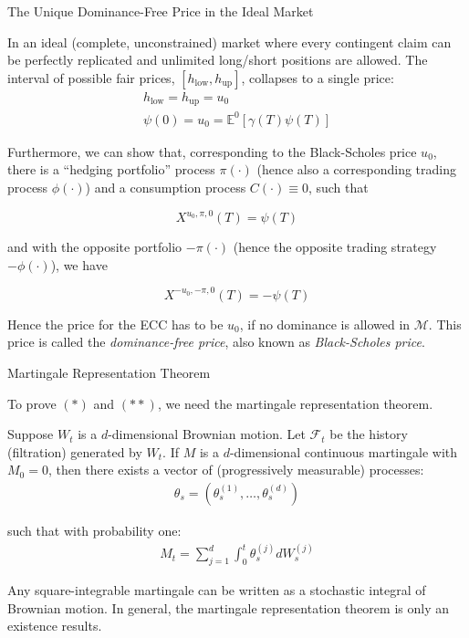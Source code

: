 \documentclass{beamer}
\begin{document}
\begin{frame}{The Unique Dominance-Free Price in the Ideal Market}

    {\footnotesize \footnotesize
    \par In an ideal (complete, unconstrained) market where every contingent claim can be perfectly replicated
    and unlimited long/short positions are allowed. The interval of possible fair prices, $ [h_{\text{low}}, h_{\text{up}}]$, 
    collapses to a single price:
    \begin{gather*}
        h_{\text{low}} = h_{\text{up}} = u_0\\
          \psi(0) = u_0 = \mathbb{E}^0[\gamma(T)\psi(T)]
    \end{gather*}
    \par Furthermore, we can show that, corresponding to the Black-Scholes price $u_0$, there is a ``hedging portfolio'' process $\pi(\cdot)$ (hence also a corresponding trading process $\phi(\cdot)$) and a consumption process $C(\cdot) \equiv 0$, such that

\[
X^{u_0,\pi,0}(T) = \psi(T) \tag{*}
\]

and with the opposite portfolio $-\pi(\cdot)$ (hence the opposite trading strategy $-\phi(\cdot)$), we have

\[
X^{-u_0,-\pi,0}(T) = -\psi(T) \tag{**}
\]

Hence the price for the ECC has to be $u_0$, if no dominance is allowed in $\mathcal{M}$. This price is called the \emph{dominance-free price}, also known as \emph{Black-Scholes price}.


    }

\end{frame} 

\begin{frame}{Martingale Representation Theorem}

    {\footnotesize \footnotesize
    \par To prove $(*)$ and $(**)$, we need the martingale representation theorem.
    \vspace{1em}
    \par Suppose $W_t$ is a $d$-dimensional Brownian motion. Let $\mathcal{F}_t$ be the history (filtration)
     generated by $W_t$. If $M$ is a $d$-dimensional continuous martingale with $M_0 = 0$, then there exists
      a vector of (progressively measurable) processes:
      \begin{align*}
        \theta_s = (\theta^{(1)}_s, \ldots, \theta^{(d)}_s)
      \end{align*}
      \par such that with probability one:
      \begin{align*}
        M_t = \sum_{j=1}^d \int_0^t \theta^{(j)}_s dW^{(j)}_s
      \end{align*}
      \par Any square-integrable martingale can be written as a stochastic integral of Brownian motion. In general, the martingale representation
theorem is only an existence results.
    }

\end{frame} 
\end{document}
